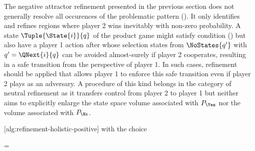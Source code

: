 \startsubsection[title={Safety},reference=sec:refinement-holistic-safety]


    The negative attractor refinement presented in the previous section does not generally resolve all occurences of the problematic pattern ().
    It only identifies and refines regions where player 2 wins inevitably with non-zero probability.
    A state $\Tuple{\State{i}}{q}$ of the product game might satisfy condition () but also have a player 1 action after whose selection states from $\NoStates{q'}$ with $q' = \QNext{i}{q}$ can be avoided almost-surely if player 2 cooperates, resulting in a safe transition from the perspective of player 1.
    In such cases, refinement should be applied that allows player 1 to enforce this safe transition even if player 2 plays as an adversary.
    A procedure of this kind belongs in the category of neutral refinement as it transfers control from player 2 to player 1 but neither aims to explicitly enlarge the state space volume associated with $P_\Yes$ nor the volume associated with $P_\No$.

    [alg:refinement-holistic-positive] with the choice

    \startformula
         = 
    \stopformula

